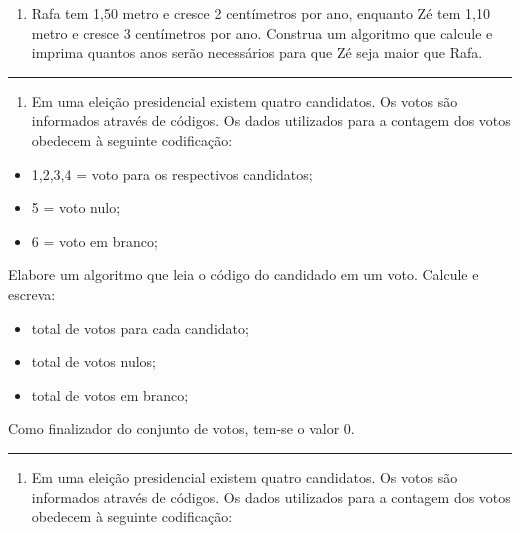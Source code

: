 \documentclass[12pt,a4paper]{article}
\providecommand{\tightlist}{%
      \setlength{\itemsep}{0pt}\setlength{\parskip}{0pt}}
\begin{document}
\begin{enumerate}
\def\labelenumi{\arabic{enumi}.}
\setcounter{enumi}{7}
\tightlist
\item
  Rafa tem 1,50 metro e cresce 2 centímetros por ano, enquanto Zé tem
  1,10 metro e cresce 3 centímetros por ano. Construa um algoritmo que
  calcule e imprima quantos anos serão necessários para que Zé seja
  maior que Rafa.
\end{enumerate}

    \begin{center}\rule{0.5\linewidth}{0.5pt}\end{center}

\begin{enumerate}
\def\labelenumi{\arabic{enumi}.}
\setcounter{enumi}{8}
\tightlist
\item
  Em uma eleição presidencial existem quatro candidatos. Os votos são
  informados através de códigos. Os dados utilizados para a contagem dos
  votos obedecem à seguinte codificação:
\end{enumerate}

\begin{itemize}
\item
  1,2,3,4 = voto para os respectivos candidatos;
\item
  5 = voto nulo;
\item
  6 = voto em branco;
\end{itemize}

Elabore um algoritmo que leia o código do candidado em um voto. Calcule
e escreva:

\begin{itemize}
\item
  total de votos para cada candidato;
\item
  total de votos nulos;
\item
  total de votos em branco;
\end{itemize}

Como finalizador do conjunto de votos, tem-se o valor 0.

    \begin{center}\rule{0.5\linewidth}{0.5pt}\end{center}

\begin{enumerate}
\def\labelenumi{\arabic{enumi}.}
\setcounter{enumi}{9}
\tightlist
\item
  Em uma eleição presidencial existem quatro candidatos. Os votos são
  informados através de códigos. Os dados utilizados para a contagem dos
  votos obedecem à seguinte codificação:
\end{enumerate}
\end{document}
